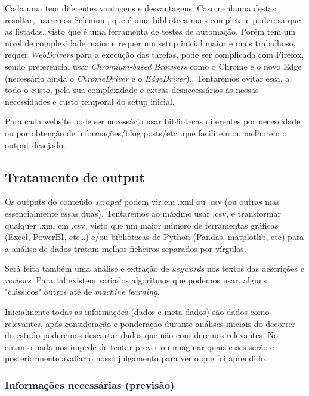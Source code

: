 \documentclass[a4paper,10pt]{article}
\begin{document}
Cada uma tem diferentes vantagens e desvantagens.
Caso nenhuma destas resultar, usaremos \href{https://pypi.org/project/selenium/}{Selenium}, que é uma biblioteca mais completa e poderosa que as listadas, visto que é uma ferramenta de testes de automação.\cite{tds3}
Porém tem um nível de complexidade maior e requer um setup inicial maior e mais trabalhoso, requer \textit{WebDrivers} para a execução das tarefas, pode ser complicada com Firefox, sendo preferencial usar \textit{Chromium-based Browsers} como o Chrome e o novo Edge (necessário ainda o \textit{ChromeDriver} e o \textit{EdgeDriver})..\cite{taw1}
Tentaremos evitar essa, a todo o custo, pela sua complexidade e extras desnecessários às nossas necessidades e custo temporal do setup inicial.\cite{fcc1}

Para cada website pode ser necessário usar bibliotecas diferentes por necessidade ou por obtenção de informações/blog posts/etc\ldots que facilitem ou melhorem o output desejado.\cite{tds1}

\subsection{Tratamento de output}

Os outputs do conteúdo \textit{scraped} podem vir em .xml ou .csv (ou outras mas essencialmente essas duas).
Tentaremos ao máximo usar .csv, e transformar qualquer .xml em .csv, visto que um maior número de ferramentas gráficas (Excel, PowerBI, etc\ldots) e/ou bibliotecas de Python (Pandas, matplotlib, etc) para a análise de dados tratam melhor ficheiros separados por vírgulas.

Será feita também uma análise e extração de \textit{keywords} nos textos das descrições e \textit{reviews}.
Para tal existem variados algoritmos que podemos usar, alguns "clássicos" outros até de \textit{machine learning}.

Inicialmente todas as informações (dados e meta-dados) são dados como relevantes, após consideração e ponderação durante análises iniciais do decorrer do estudo poderemos descartar dados que não consideremos relevantes.
No entanto nada nos impede de tentar prever ou imaginar quais esses serão e posteriormente avaliar o nosso julgamento para ver o que foi aprendido.

\subsubsection{Informações necessárias (previsão)}
\end{document}
